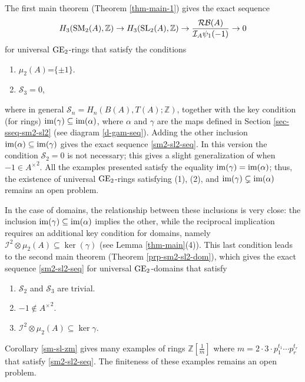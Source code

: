 \documentclass[11pt]{amsart}
\theoremstyle{definition}
\theoremstyle{plain}
\numberwithin{equation}{section}
\newcommand{\z}{\mathbb{Z}}
\newcommand{\II}{\mathcal{I}}
\newcommand{\RB}{\mathcal{RB}}
\renewcommand{\SS}{\mathcal{S}}
\renewcommand{\aa}{{A^\times}}
\newcommand{\mth}[1]{\left[ \frac{1}{#1} \right]}
\newcommand{\GE}{{\rm GE}}
\newcommand{\SL}{\mathit{{\rm SL}}}
\newcommand{\SM}{\mathit{{\rm SM}}}
\newcommand{\im}{{\rm im}}
\begin{document}
The first main theorem (Theorem \ref{thm-main-1}) gives the exact sequence 
\[
    H_3(\SM_2(A),\z)\to H_3(\SL_2(A),\z)\to\frac{\RB(A)}{\II_A\psi_1(-1)}\to 0
\]
for universal $\GE_2$-rings that satisfy the conditions
\begin{enumerate}
    \item $\mu_2(A)$=$\{\pm 1\}$.
    \item $\SS_3=0$,
\end{enumerate}
where in general $\SS_n=H_n(B(A),T(A);\z)$, together with the key condition (for rings) $\im(\gamma)\subseteq\im(\alpha)$, where $\alpha$ and $\gamma$ are the maps defined in Section \ref{sec-sseq-sm2-sl2} (see diagram \eqref{d-gam-seq}). Adding the other inclusion $\im(\alpha)\subseteq\im(\gamma)$ gives the exact sequence \ref{sm2-sl2-seq}. In this version the condition $\SS_2=0$ is not necessary; this gives a slight generalization of \cite[Theorem 6.6]{B-E--2023} when $-1\in\aa^2$. All the examples presented satisfy the equality $\im(\gamma)=\im(\alpha)$; thus, the existence of universal $\GE_2$-rings satisfying (1), (2), and $\im(\gamma)\subsetneq\im(\alpha)$ remains an open problem. 

In the case of domains, the relationship between these inclusions is very close: the inclusion $\im(\gamma)\subseteq\im(\alpha)$ implies the other, while the reciprocal implication requires an additional key condition for domains, namely $\II^2\otimes\mu_2(A)\subseteq\ker(\gamma)$ (see Lemma \ref{thm-main}(4)). This last condition leads to the second main theorem (Theorem \ref{prp-sm2-sl2-dom}), which gives the exact sequence \ref{sm2-sl2-seq} for universal $\GE_2$-domains that satisfy
\begin{enumerate}
    \item $\SS_2$ and $\SS_3$ are trivial.
    \item $-1\notin\aa^2$.
    \item $\II^2\otimes\mu_2(A)\subseteq\ker\gamma$.
\end{enumerate}

Corollary \ref{sm-sl-zm} gives many examples of rings $\z\mth{m}$ where $m=2\cdot 3\cdot p^{t_1}_1\cdots p^{t_r}_r$ that satisfy \eqref{sm2-sl2-seq}. The finiteness of these examples remains an open problem.
\end{document}
